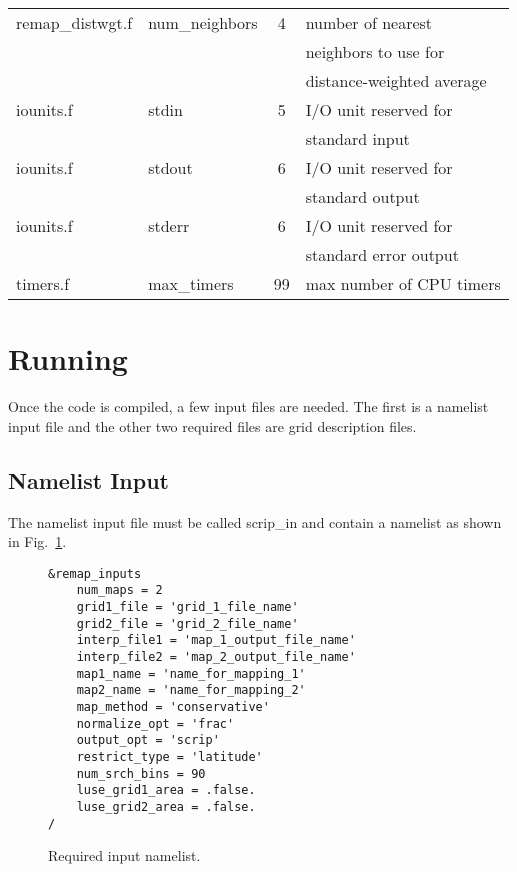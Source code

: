 \documentclass[12pt]{report}
\begin{document}
\begin{table}
\begin{tabular}{|l|l|c|l|}
\hline
remap\_distwgt.f   &  num\_neighbors  &    4     &  number of nearest       \\
                   &                  &          &  neighbors to use for    \\
                   &                  &          &  distance-weighted average\\
\hline
iounits.f          &  stdin           &    5     &  I/O unit reserved for \\
                   &                  &          &  standard input \\ \hline
iounits.f          &  stdout          &    6     &  I/O unit reserved for \\
                   &                  &          &  standard output \\ \hline
iounits.f          &  stderr          &    6     &  I/O unit reserved for \\
                   &                  &          &  standard error output \\
\hline
timers.f           &  max\_timers     &   99     &  max number of CPU timers \\
\hline
\end{tabular}
\end{table}

\section{Running}

Once the code is compiled, a few input files are needed.
The first is a namelist input file and the other two
required files are grid description files.

\subsection{Namelist Input}

The namelist input file must be called scrip\_in
and contain a namelist as shown in Fig.~\ref{fig:nml}.

\begin{figure}
\caption{Required input namelist. \label{fig:nml}}
\begin{verbatim}
&remap_inputs
    num_maps = 2
    grid1_file = 'grid_1_file_name'
    grid2_file = 'grid_2_file_name'
    interp_file1 = 'map_1_output_file_name'
    interp_file2 = 'map_2_output_file_name'
    map1_name = 'name_for_mapping_1'
    map2_name = 'name_for_mapping_2'
    map_method = 'conservative'
    normalize_opt = 'frac'
    output_opt = 'scrip'
    restrict_type = 'latitude'
    num_srch_bins = 90
    luse_grid1_area = .false.
    luse_grid2_area = .false.
/
\end{verbatim}
\end{figure}
\end{document}
